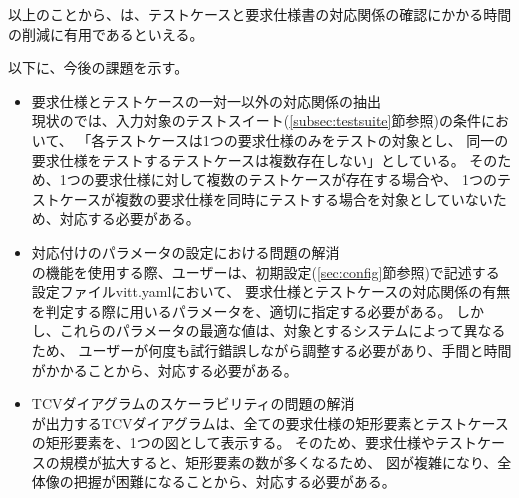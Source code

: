 以上のことから、\tool{}は、テストケースと要求仕様書の対応関係の確認にかかる時間の削減に有用であるといえる。

以下に、今後の課題を示す。

\begin{itemize}
    \item 要求仕様とテストケースの一対一以外の対応関係の抽出\\
    現状の\tool{}では、入力対象のテストスイート(\ref{subsec:testsuite}節参照)の条件において、
    「各テストケースは1つの要求仕様のみをテストの対象とし、
    同一の要求仕様をテストするテストケースは複数存在しない」としている。
    そのため、1つの要求仕様に対して複数のテストケースが存在する場合や、
    1つのテストケースが複数の要求仕様を同時にテストする場合を対象としていないため、対応する必要がある。

    \item 対応付けのパラメータの設定における問題の解消\\
    \tool{}の機能を使用する際、ユーザーは、初期設定(\ref{sec:config}節参照)で記述する設定ファイルvitt.yamlにおいて、
    要求仕様とテストケースの対応関係の有無を判定する際に用いるパラメータを、適切に指定する必要がある。
    しかし、これらのパラメータの最適な値は、対象とするシステムによって異なるため、
    ユーザーが何度も試行錯誤しながら調整する必要があり、手間と時間がかかることから、対応する必要がある。

    \item TCVダイアグラムのスケーラビリティの問題の解消\\
    \tool{}が出力するTCVダイアグラムは、全ての要求仕様の矩形要素とテストケースの矩形要素を、1つの図として表示する。
    そのため、要求仕様やテストケースの規模が拡大すると、矩形要素の数が多くなるため、
    図が複雑になり、全体像の把握が困難になることから、対応する必要がある。
\end{itemize}

